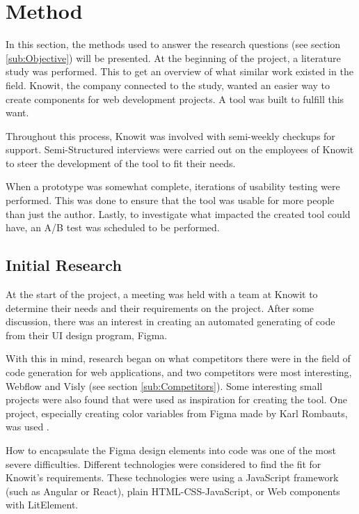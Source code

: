 \section{Method}

In this section, the methods used to answer the research questions (see section \ref{sub:Objective}) will be presented. At the beginning of the project, a literature study was performed. This to get an overview of what similar work existed in the field. Knowit, the company connected to the study, wanted an easier way to create components for web development projects. A tool was built to fulfill this want. 

Throughout this process, Knowit was involved with semi-weekly checkups for support. Semi-Structured interviews were carried out on the employees of Knowit to steer the development of the tool to fit their needs. 

When a prototype was somewhat complete, iterations of usability testing were performed. This was done to ensure that the tool was usable for more people than just the author. Lastly, to investigate what impacted the created tool could have, an A/B test was scheduled to be performed.

\subsection{Initial Research}%
\label{sub:Initial Research}

At the start of the project, a meeting was held with a team at Knowit to determine their needs and their requirements on the project. After some discussion, there was an interest in creating an automated generating of code from their UI design program, Figma. 

With this in mind, research began on what competitors there were in the field of code generation for web applications, and two competitors were most interesting, Webflow and Visly (see section \ref{sub:Competitors}). Some interesting small projects were also found that were used as inspiration for creating the tool. One project, especially creating color variables from Figma made by Karl Rombauts, was used \cite{rombautsKarlRombautsFigmaSCSSGenerator2021}.

How to encapsulate the Figma design elements into code was one of the most severe difficulties.  Different technologies were considered to find the fit for Knowit's requirements.  These technologies were using a JavaScript framework (such as Angular or React), plain HTML-CSS-JavaScript, or Web components with LitElement. 

